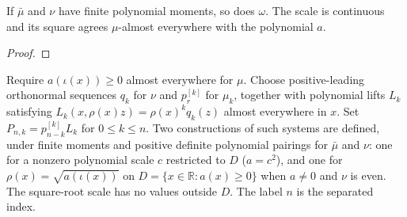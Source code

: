 \begin{supporting}
\begin{theorem}
\label{thm:koornwinder-moments}
\leanok
If $\bar\mu$ and $\nu$ have finite polynomial moments, so does $\omega$.
The scale is continuous and its square agrees $\mu$-almost everywhere with
the polynomial $a$.
\end{theorem}
\begin{proof}
\leanok
\end{proof}
\end{supporting}


\begin{definition}
\label{def:koornwinder-system}
\leanok
Require $a(\iota(x))\ge0$ almost everywhere for $\mu$.
Choose positive-leading orthonormal sequences $q_k$ for $\nu$ and
$p_r^{[k]}$ for $\mu_k$, together with polynomial lifts $L_k$ satisfying
$L_k(x,\rho(x)z)=\rho(x)^kq_k(z)$ almost everywhere in $x$.
Set $P_{n,k}=p_{n-k}^{[k]}L_k$ for $0\le k\le n$.
Two constructions of such systems are defined, under finite moments and
positive definite polynomial pairings for $\bar\mu$ and $\nu$: one for a
nonzero polynomial scale $c$ restricted to $D$ ($a=c^2$), and one for
$\rho(x)=\sqrt{a(\iota(x))}$ on $D=\{x\in\mathbb R:a(x)\ge0\}$ when
$a\ne0$ and $\nu$ is even. The square-root scale has no values outside $D$.
The label $n$ is the separated index.
\end{definition}



